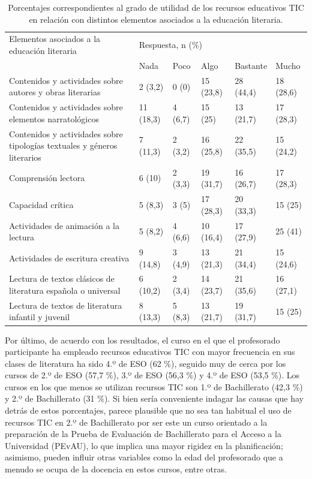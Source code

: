 \documentclass[spanish]{textolivre}
\begin{document}
\begin{table}[htbp]
\caption{Porcentajes correspondientes al grado de utilidad de los recursos educativos TIC en relación con distintos elementos asociados a la educación literaria.}
\label{tbl06}
\centering
\begin{tabular}{p{}lllll}
\toprule
Elementos asociados a la educación literaria & \multicolumn{5}{l}{Respuesta, n (\%)}\\
 & Nada & Poco & Algo & Bastante & Mucho \\
\midrule 
Contenidos y actividades sobre autores y obras literarias & 2 (3,2) & 0 (0) & 15 (23,8) & 28 (44,4) & 18 (28,6) \\
Contenidos y actividades sobre elementos narratológicos & 11 (18,3) & 4 (6,7) & 15 (25) & 13 (21,7) & 17 (28,3) \\
Contenidos y actividades sobre tipologías textuales y géneros literarios & 7 (11,3) & 2 (3,2) & 16 (25,8) & 22 (35,5) & 15 (24,2) \\
Comprensión lectora & 6 (10) & 2 (3,3) & 19 (31,7) & 16 (26,7) & 17 (28,3) \\
Capacidad crítica & 5 (8,3) & 3 (5) & 17 (28,3) & 20 (33,3) & 15 (25) \\
Actividades de animación a la lectura & 5 (8,2) & 4 (6,6) & 10 (16,4) & 17 (27,9) & 25 (41) \\
Actividades de escritura creativa & 9 (14,8) & 3 (4,9) & 13 (21,3) & 21 (34,4) & 15 (24,6) \\
Lectura de textos clásicos de literatura española o universal & 6 (10,2) & 2 (3,4) & 14 (23,7) & 21 (35,6) & 16 (27,1) \\
Lectura de textos de literatura infantil y juvenil & 8 (13,3) & 5 (8,3) & 13 (21,7) & 19 (31,7) & 15 (25) \\
\bottomrule
\end{tabular}
\end{table}

Por último, de acuerdo con los resultados, el curso en el que el profesorado participante ha empleado recursos educativos TIC con mayor frecuencia en sus clases de literatura ha sido 4.º de ESO (62 \%), seguido muy de cerca por los cursos de 2.º de ESO (57,7 \%), 3.º de ESO (56,3 \%) y 4.º de ESO (53,5 \%). Los cursos en los que menos se utilizan recursos TIC son 1.º de Bachillerato (42,3 \%) y 2.º de Bachillerato (31 \%). Si bien sería conveniente indagar las causas que hay detrás de estos porcentajes, parece plausible que no sea tan habitual el uso de recursos TIC en 2.º de Bachillerato por ser este un curso orientado a la preparación de la Prueba de Evaluación de Bachillerato para el Acceso a la Universidad (PEvAU), lo que implica una mayor rigidez en la planificación; asimismo, pueden influir otras variables como la edad del profesorado que a menudo se ocupa de la docencia en estos cursos, entre otras.
\end{document}
